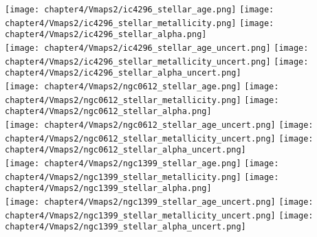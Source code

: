 \begin{figure*}
	\centering
	\texttt{[image: chapter4/Vmaps2/ic4296\_stellar\_age.png]}
	\texttt{[image: chapter4/Vmaps2/ic4296\_stellar\_metallicity.png]}
	\texttt{[image: chapter4/Vmaps2/ic4296\_stellar\_alpha.png]}
	\\
	\texttt{[image: chapter4/Vmaps2/ic4296\_stellar\_age\_uncert.png]}
	\texttt{[image: chapter4/Vmaps2/ic4296\_stellar\_metallicity\_uncert.png]}
	\texttt{[image: chapter4/Vmaps2/ic4296\_stellar\_alpha\_uncert.png]}
	\\
	\texttt{[image: chapter4/Vmaps2/ngc0612\_stellar\_age.png]}
	\texttt{[image: chapter4/Vmaps2/ngc0612\_stellar\_metallicity.png]}
	\texttt{[image: chapter4/Vmaps2/ngc0612\_stellar\_alpha.png]}
	\\
	\texttt{[image: chapter4/Vmaps2/ngc0612\_stellar\_age\_uncert.png]}
	\texttt{[image: chapter4/Vmaps2/ngc0612\_stellar\_metallicity\_uncert.png]}
	\texttt{[image: chapter4/Vmaps2/ngc0612\_stellar\_alpha\_uncert.png]}
	\\
	\texttt{[image: chapter4/Vmaps2/ngc1399\_stellar\_age.png]}
	\texttt{[image: chapter4/Vmaps2/ngc1399\_stellar\_metallicity.png]}
	\texttt{[image: chapter4/Vmaps2/ngc1399\_stellar\_alpha.png]}
	\\
	\texttt{[image: chapter4/Vmaps2/ngc1399\_stellar\_age\_uncert.png]}
	\texttt{[image: chapter4/Vmaps2/ngc1399\_stellar\_metallicity\_uncert.png]}
	\texttt{[image: chapter4/Vmaps2/ngc1399\_stellar\_alpha\_uncert.png]}
	\\
\end{figure*}

